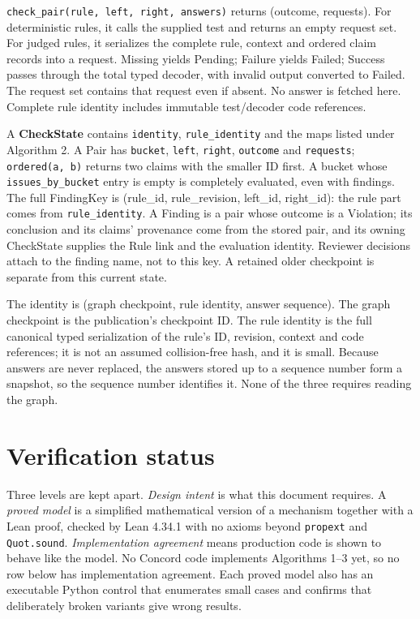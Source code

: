 \documentclass[11pt]{article}
\newcommand{\code}[1]{\texttt{#1}}
\begin{document}
\code{check\_pair(rule, left, right, answers)} returns (outcome, requests).
For deterministic rules, it calls the supplied test and returns an empty request
set. For judged rules, it serializes the complete rule, context and ordered claim
records into a request. Missing yields Pending; Failure yields Failed; Success
passes through the total typed decoder, with invalid output converted to Failed.
The request set contains that request even if absent. No answer is fetched here.
Complete rule identity includes immutable test/decoder code references.

A \textbf{CheckState} contains \code{identity}, \code{rule\_identity} and the
maps listed under Algorithm 2. A Pair has \code{bucket}, \code{left},
\code{right}, \code{outcome} and \code{requests}; \code{ordered(a, b)} returns
two claims with the smaller ID first. A bucket whose \code{issues\_by\_bucket}
entry is empty is completely evaluated, even with findings. The full FindingKey
is (rule\_id, rule\_revision, left\_id, right\_id): the rule part comes from
\code{rule\_identity}. A Finding is a pair whose outcome is a Violation; its
conclusion and its claims' provenance come from the stored pair, and its owning
CheckState supplies the Rule link and the evaluation identity. Reviewer
decisions attach to the finding name, not to this key. A retained older checkpoint is separate from this
current state.

The identity is (graph checkpoint, rule identity, answer sequence). The graph
checkpoint is the publication's checkpoint ID. The rule identity is the full
canonical typed serialization of the rule's ID, revision, context and code
references; it is not an assumed collision-free hash, and it is small. Because
answers are never replaced, the answers stored up to a sequence number form a
snapshot, so the sequence number identifies it. None of the three requires
reading the graph.


\section{Verification status}\label{sec:status}

Three levels are kept apart. \emph{Design intent} is what this document
requires. A \emph{proved model} is a simplified mathematical version of a
mechanism together with a Lean proof, checked by Lean 4.34.1 with no axioms
beyond \code{propext} and \code{Quot.sound}. \emph{Implementation agreement}
means production code is shown to behave like the model. No Concord code
implements Algorithms 1--3 yet, so no row below has implementation agreement.
Each proved model also has an executable Python control that enumerates small
cases and confirms that deliberately broken variants give wrong results.
\end{document}
